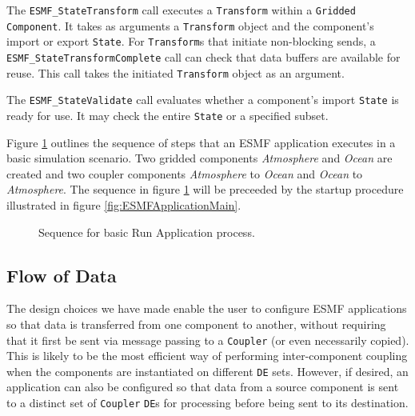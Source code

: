 The {\tt ESMF\_StateTransform} call executes a {\tt Transform} 
within a {\tt Gridded Component}.  It takes as arguments a
{\tt Transform} object and the component's import or export {\tt State}.  
For {\tt Transform}s that initiate non-blocking sends, a {\tt ESMF\_StateTransformComplete} 
call can check that data  buffers are available for reuse.  This 
call takes the initiated {\tt Transform} object as an argument.

The {\tt ESMF\_StateValidate} call evaluates whether a component's 
import {\tt State} is ready for use.  It may check the entire {\tt State} or 
a specified subset.

Figure \ref{fig:RunApplicationDiagram} outlines the sequence of steps that an ESMF application
executes in a basic simulation scenario. Two gridded components {\it Atmosphere} and {\it Ocean}
are created and two coupler components {\it Atmosphere} to {\it Ocean} and {\it Ocean} to {\it Atmosphere}.
The sequence in figure \ref{fig:RunApplicationDiagram} will be preceeded by the startup procedure illustrated
in figure \ref{fig:ESMFApplicationMain}.

\begin{figure}
\caption[{Basic Run Application}]{Sequence for basic Run Application process.\\}
\label{fig:RunApplicationDiagram}
\end{figure}

\subsection{Flow of Data}
\label{sec:dataflow}
The design choices we have made enable the user to configure ESMF
applications so that data is transferred from one component to another, 
without requiring that it first be sent via message passing to a
{\tt Coupler} (or even necessarily
copied).  This is likely to be the most efficient way of performing 
inter-component coupling when the components are instantiated on different
{\tt DE} sets.  However, if desired, an application can also be configured so that
data from a source component is sent to a distinct set of {\tt Coupler} 
{\tt DE}s for processing before being sent to its destination.

